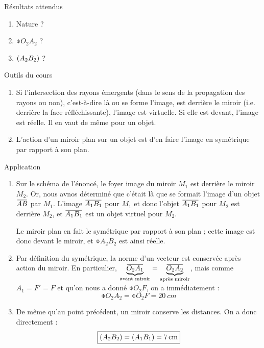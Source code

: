 \documentclass[10pt,a5paper,notitlepage]{book}
\begin{document}
\begin{rtcb}{Résultats attendus}
    \begin{enumerate}
        \item Nature ?
        \item $\obar{O_2A_2}$ ?
        \item $\left(A_2B_2\right)$ ?
    \end{enumerate}
\end{rtcb}

\begin{btcb}{Outils du cours}
    \begin{enumerate}
        \item Si l'intersection des rayons émergents (dans le sens de la
            propagation des rayons ou non), c'est-à-dire là ou se forme l'image,
            est derrière le miroir (i.e. derrière la face réfléchissante),
            l'image est virtuelle. Si elle est devant, l'image est réelle. Il en
            vaut de même pour un objet.
        \item L'action d'un miroir plan sur un objet est d'en faire l'image en
            symétrique par rapport à son plan.
    \end{enumerate}
\end{btcb}

\begin{lgtcb}{Application}
    \begin{enumerate}
        \item Sur le schéma de l'énoncé, le foyer image du miroir $M_1$ est
            derrière le miroir $M_2$. Or, nous avnos déterminé que c'était là
            que se formait l'image d'un objet $\ABb$ par $M_1$. L'image $\ABa$
            pour $M_1$ et donc l'objet $\ABa$ pour $M_2$ est derrière $M_2$, et
            $\ABa$ est un objet virtuel pour $M_2$.

            Le miroir plan en fait le symétrique par rapport à son plan ;
            cette image est donc devant le miroir, et $\obar{A_2B_2}$ est ainsi
            réelle.

        \item Par définition du symétrique, la norme d'un vecteur est conservée
            après action du miroir. En particulier,
            $\underbrace{\obar{O_2A_1}}\St{avant miroir} =
            \underbrace{\obar{O_2A_2}}\St{après miroir}$, mais comme $A_1 = F' =
            F$ et qu'on nous a donné $\obar{O_2F}$, on a immédiatement :
            \[ \boxed{\obar{O_2A_2}= \obar{O_2F} = \SI{20}{cm}} \]

        \item De même qu'au point précédent, un miroir conserve les distances.
            On a donc directement :
            \[ \boxed{ \left(A_2B_2\right) = \left(A_1B_1\right) = \SI{7}{cm}} \]
    \end{enumerate}
\end{lgtcb}
\end{document}
